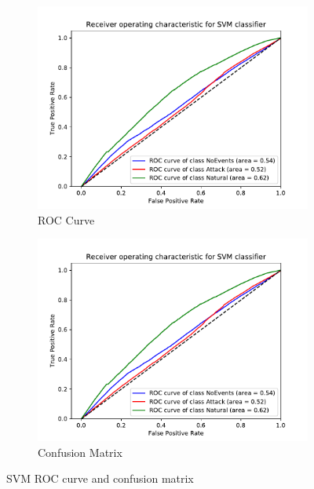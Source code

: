 \begin{figure}[H]
    \begin{subfigure}[t]{0.45\textwidth}
        \centering
        \includegraphics[page=1, width=\linewidth]{images/results_scikit/SVM}
        \caption{ROC Curve}
        \label{fig:scikit_SVM_ROC}
    \end{subfigure}
    \begin{subfigure}[t]{0.45\textwidth}
        \centering
        \includegraphics[page=2, width=\linewidth, trim= 0 50 0 100, clip]{images/results_scikit/SVM}
        \caption{Confusion Matrix}
        \label{fig:scikit_SVM_CM}
    \end{subfigure}
    \caption{SVM ROC curve and confusion matrix}
    \label{fig:ROCCM_SVM}
\end{figure}

